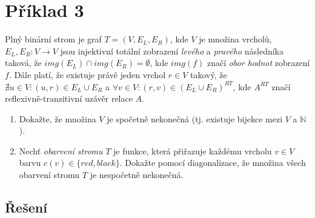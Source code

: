 \documentclass[a4paper, 12pt]{article}
\theoremstyle{definition}
\theoremstyle{definition}
\theoremstyle{definition}
\theoremstyle{remark}
\begin{document}
\section{Příklad 3}
Plný binární strom je graf $T = (V, E_L, E_R)$, kde $V$ je množina vrcholů, $E_L, E_R: V \rightarrow V$ jsou injektivní totální zobrazení \textit{levého} a \textit{pravého} následníka taková, že $img(E_L) \cap img(E_R) = \emptyset$, kde $img(f)$ značí \textit{obor hodnot} zobrazení $f$. Dále platí, že existuje právě jeden vrchol $r \in V$ takový, že $\nexists u \in V: (u, r) \in E_L \cup E_R$ a $\forall v \in V: (r, v) \in (E_L \cup E_R)^{RT}$, kde $A^{RT}$ značí reflexivně-tranzitivní uzávěr relace $A$.

\begin{enumerate}[label=(\alph*)]
    \item Dokažte, že množina $V$ je spočetně nekonečná (tj. existuje bijekce mezi $V$ a $\mathbb{N}$).
    \item Nechť \textit{obarvení stromu} $T$ je funkce, která přiřazuje každému vrcholu $v \in V$ barvu $c(v) \in \{red, black\}$. Dokažte pomocí diagonalizace, že množina všech obarvení stromu $T$ je nespočetně nekonečná.
\end{enumerate}

\subsection{Řešení}
\end{document}
